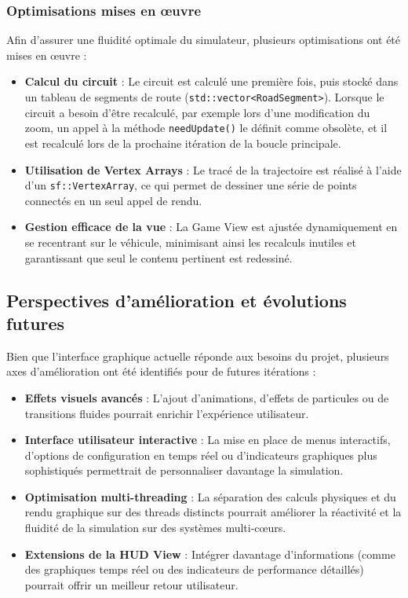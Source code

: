\subsubsection{Optimisations mises en œuvre}\label{subsubsec:optimisations-mises-en-oeuvre}
Afin d'assurer une fluidité optimale du simulateur, plusieurs optimisations ont été mises en œuvre :
\begin{itemize}
    \item \textbf{Calcul du circuit} : Le circuit est calculé une première fois, puis stocké dans un tableau de segments de route (\texttt{std::vector<RoadSegment>}\cite{cpp_reference_vector}).
    Lorsque le circuit a besoin d'être recalculé, par exemple lors d'une modification du zoom, un appel à la méthode \texttt{needUpdate()} le définit comme obsolète, et il est recalculé lors de la prochaine itération de la boucle principale.
    \item \textbf{Utilisation de Vertex Arrays} : Le tracé de la trajectoire est réalisé à l'aide d'un \texttt{sf::VertexArray}\cite{sfml_sf_vertexarray}, ce qui permet de dessiner une série de points connectés en un seul appel de rendu.
    \item \textbf{Gestion efficace de la vue} : La Game View est ajustée dynamiquement en se recentrant sur le véhicule, minimisant ainsi les recalculs inutiles et garantissant que seul le contenu pertinent est redessiné.
\end{itemize}

\subsection{Perspectives d'amélioration et évolutions futures}\label{subsec:perspectives-d-evolution}
Bien que l'interface graphique actuelle réponde aux besoins du projet, plusieurs axes d'amélioration ont été identifiés pour de futures itérations :
\begin{itemize}
    \item \textbf{Effets visuels avancés} : L'ajout d'animations, d'effets de particules ou de transitions fluides pourrait enrichir l'expérience utilisateur.
    \item \textbf{Interface utilisateur interactive} : La mise en place de menus interactifs, d'options de configuration en temps réel ou d'indicateurs graphiques plus sophistiqués permettrait de personnaliser davantage la simulation.
    \item \textbf{Optimisation multi-threading} : La séparation des calculs physiques et du rendu graphique sur des threads distincts pourrait améliorer la réactivité et la fluidité de la simulation sur des systèmes multi-cœurs.
    \item \textbf{Extensions de la HUD View} : Intégrer davantage d'informations (comme des graphiques temps réel ou des indicateurs de performance détaillés) pourrait offrir un meilleur retour utilisateur.
\end{itemize}
